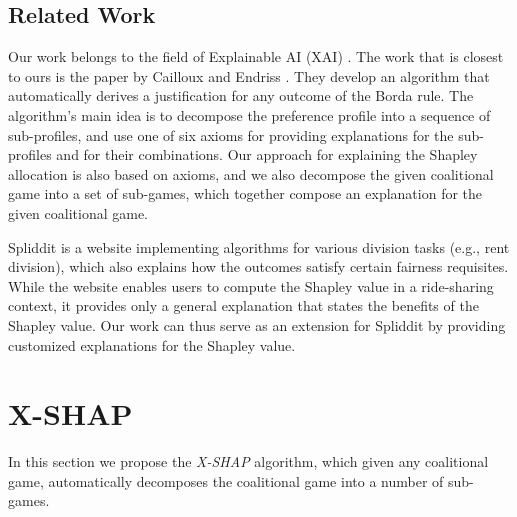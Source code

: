 \documentclass[letterpaper]{article}
\begin{document}
\subsection{Related Work}
Our work belongs to the field of Explainable AI (XAI) \cite{gunning2019xai}. %
The work that is closest to ours is the paper by Cailloux and Endriss \cite{Cailloux2016ArguingAV}.
They %
develop an algorithm that automatically derives a justification for any outcome of the Borda rule. The algorithm's main idea is to decompose the preference profile into a sequence of sub-profiles, and use one of six axioms for providing explanations for the sub-profiles and for their combinations. %
Our approach for explaining the Shapley allocation is also based on axioms, and we also decompose the given coalitional game into a set of sub-games, which together compose an explanation for the given coalitional game.


Spliddit \cite{Goldman14spliddit:unleashing} is a website implementing algorithms for various division tasks (e.g., rent division), which also explains how the outcomes satisfy certain fairness requisites.
While the website enables users to compute the Shapley value in a ride-sharing context, it provides only a general explanation that states the benefits of the Shapley value.
Our work can thus serve as an extension for Spliddit by providing customized explanations for the Shapley value.






\section{X-SHAP}
In this section we propose the \textit{X-SHAP} algorithm, %
which given any coalitional game, automatically decomposes the coalitional game into a number of sub-games. %
\end{document}
